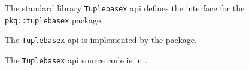 
The standard library {\tt Tuplebasex} api defines the interface for the {\tt pkg::tuplebasex} package.

The {\tt Tuplebasex} api is implemented by the 
 package.

The {\tt Tuplebasex} api source code is in .
